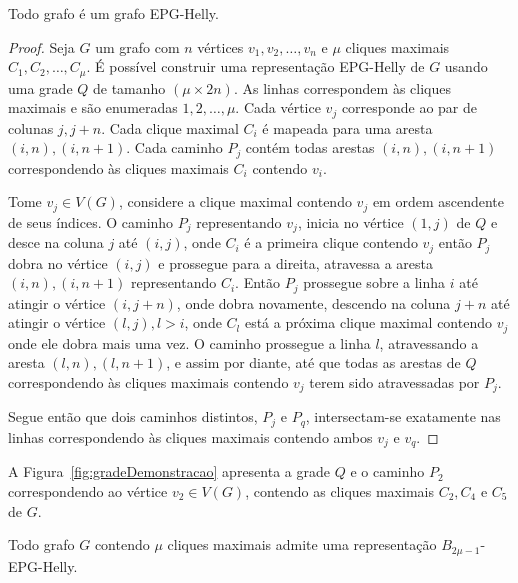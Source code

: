  \begin{lema}\label{lem:todoGrafoEpgHelly}
 Todo grafo é um grafo EPG-Helly.
 \end{lema}
  \begin{proof}
  Seja $G$ um grafo com $n$ vértices $v_1, v_2, \dots, v_n$ e $\mu$ cliques maximais $C_1, C_2, \dots , C_{\mu }$. É possível construir uma representação EPG-Helly de $G$ usando uma grade $Q$ de tamanho $(\mu \times 2n)$. As linhas correspondem às cliques maximais e são enumeradas $1, 2, \dots , \mu$. Cada vértice $v_j$ corresponde ao par de colunas $j, j+n$. Cada clique maximal  $C_i$ é mapeada para uma aresta $(i,n), (i,n+1)$. Cada caminho $P_j$ contém todas arestas $(i,n), (i,n+1)$ correspondendo às cliques maximais $C_i$ contendo $v_i$.
  
  
  Tome $v_j \in V(G)$, considere a clique maximal contendo $v_j$ em ordem ascendente de seus índices. O caminho $P_j$ representando $v_j$, inicia no vértice $(1,j)$ de $Q$ e desce na coluna $j$ até $(i,j)$, onde $C_i$ é a primeira clique contendo $v_j$ então $P_j$ dobra no vértice  $(i,j)$ e prossegue para a direita, atravessa a aresta $(i,n), (i,n+1)$ representando $C_i$. Então $P_j$ prossegue  sobre a linha $i$ até atingir o vértice  $(i, j+n)$, onde dobra novamente, descendo na coluna $j+n$ até atingir o vértice $(l,j), l>i$, onde $C_l$ está a próxima clique maximal contendo  $v_j$ onde ele dobra mais uma vez. O caminho prossegue a linha $l$, atravessando a aresta $(l,n),(l,n+1)$, e assim por diante, até que todas as arestas de $Q$ correspondendo às cliques maximais contendo $v_j$ terem sido atravessadas por $P_j$.   
  
Segue então que dois caminhos distintos, $P_j$ e $P_q$, intersectam-se exatamente nas linhas correspondendo às cliques maximais contendo ambos $v_j$ e $v_q$.  
  \end{proof}
 
 A Figura~\ref{fig:gradeDemonstracao} apresenta a grade $Q$ e o caminho $P_2$ correspondendo ao vértice $v_2 \in V(G)$, contendo as cliques maximais  $C_2, C_4$ e $C_5$ de $G$.
 
  
 
 
 
 \begin{corollary}
 Todo grafo $G$ contendo  $\mu$ cliques maximais admite uma representação $B_{2\mu -1}$-EPG-Helly. %
 \end{corollary}
 

